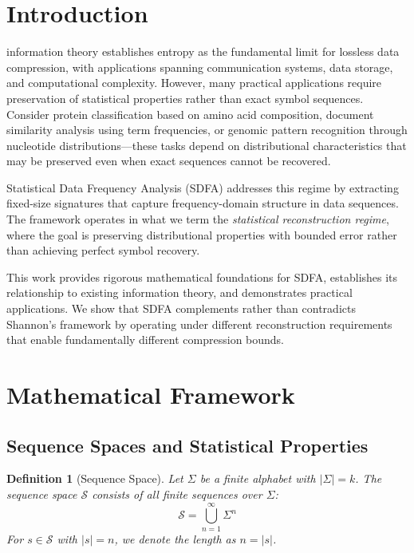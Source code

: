 \documentclass[10pt,journal,compsoc]{IEEEtran}
\newtheorem{definition}{Definition}
\newcommand{\sdfa}{\textsc{SDFA}}
\newcommand{\seqspace}{\mathcal{S}}
\newcommand{\alphabet}{\Sigma}
\begin{document}
\IEEEpeerreviewmaketitle

\section{Introduction}

 information theory \cite{shannon_mathematical_1948} establishes entropy as the fundamental limit for lossless data compression, with applications spanning communication systems, data storage, and computational complexity. However, many practical applications require preservation of statistical properties rather than exact symbol sequences. Consider protein classification based on amino acid composition, document similarity analysis using term frequencies, or genomic pattern recognition through nucleotide distributions—these tasks depend on distributional characteristics that may be preserved even when exact sequences cannot be recovered.

Statistical Data Frequency Analysis (\sdfa) addresses this regime by extracting fixed-size signatures that capture frequency-domain structure in data sequences. The framework operates in what we term the \textit{statistical reconstruction regime}, where the goal is preserving distributional properties with bounded error rather than achieving perfect symbol recovery.

This work provides rigorous mathematical foundations for \sdfa, establishes its relationship to existing information theory, and demonstrates practical applications. We show that \sdfa{} complements rather than contradicts Shannon's framework by operating under different reconstruction requirements that enable fundamentally different compression bounds.

\section{Mathematical Framework}

\subsection{Sequence Spaces and Statistical Properties}

\begin{definition}[Sequence Space]
Let $\alphabet$ be a finite alphabet with $|\alphabet| = k$. The sequence space $\seqspace$ consists of all finite sequences over $\alphabet$:
\[\seqspace = \bigcup_{n=1}^{\infty} \alphabet^n\]
For $s \in \seqspace$ with $|s| = n$, we denote the length as $n = |s|$.
\end{definition}
\end{document}
